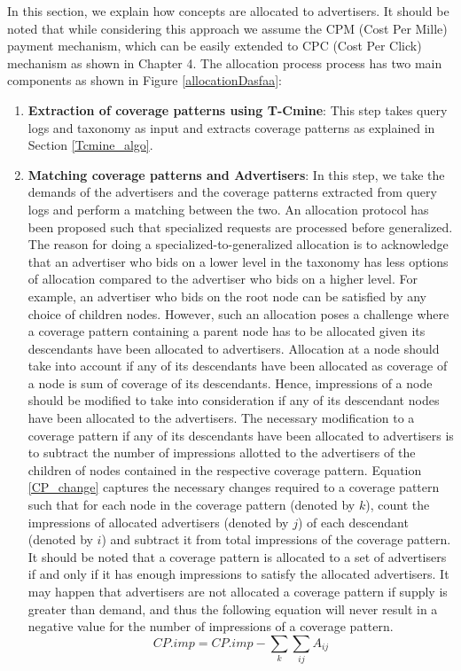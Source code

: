 In this section, we explain how concepts are allocated to advertisers. It should be noted that while considering this approach we assume the CPM (Cost Per Mille) payment mechanism, which can be easily extended to CPC (Cost Per Click) mechanism as shown in Chapter 4. The allocation process process has two main components as shown in Figure \ref{allocationDasfaa}:

\begin{enumerate}[label=(\roman*).]
    \item {\textbf{Extraction of coverage patterns using T-Cmine}}: This step takes query logs and taxonomy as input and extracts coverage patterns as explained in Section \ref{Tcmine_algo}.
    \item{\textbf{Matching coverage patterns and Advertisers}}: In this step, we take the demands of the advertisers and the coverage patterns extracted from query logs and perform a matching between the two. An allocation protocol has been proposed such that specialized requests are processed before generalized. The reason for doing a specialized-to-generalized allocation is to acknowledge that an advertiser who bids on a lower level in the taxonomy has less options of allocation compared to the advertiser who bids on a higher level. For example, an advertiser who bids on the root node can be satisfied by any choice of children nodes. However, such an allocation poses a challenge where a coverage pattern containing a parent node has to be allocated given its descendants have been allocated to advertisers. Allocation at a node should take into account if any of its descendants have been allocated as coverage of a node is sum of coverage of its descendants. Hence, impressions of a node should be modified to take into consideration if any of its descendant nodes have been allocated to the advertisers. The necessary modification to a coverage pattern if any of its descendants have been allocated to advertisers is to subtract the number of impressions allotted to the advertisers of the children of nodes contained in the respective coverage pattern. Equation \ref{CP_change} captures the necessary changes required to a coverage pattern such that for each node in the coverage pattern (denoted by $k$), count the impressions of allocated advertisers (denoted by $j$) of each descendant (denoted by $i$) and subtract it from total impressions of the coverage pattern. It should be noted that a coverage pattern is allocated to a set of advertisers if and only if it has enough impressions to satisfy the allocated advertisers. It may happen that advertisers are not allocated a coverage pattern if supply is greater than demand, and thus the following equation will never result in a negative value for the number of impressions of a coverage pattern.
    \begin{equation}
    \label{CP_change}
    CP.imp = CP.imp - \sum_{k}\sum_{ij}A_{ij}
    \end{equation}

    \end{enumerate}
    

